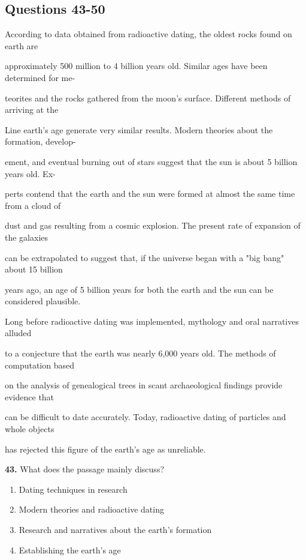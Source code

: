\documentclass[12pt]{article}
\begin{document}
\subsection*{Questions 43-50}
\begingroup
\small
\sloppy
\setlength{\parskip}{0pt}
\setlength{\parindent}{0pt}
According to data obtained from radioactive dating, the oldest rocks found on earth are\par
approximately 500 million to 4 billion years old. Similar ages have been determined for me-\par
teorites and the rocks gathered from the moon's surface. Different methods of arriving at the\par
Line earth's age generate very similar results. Modern theories about the formation, develop-\par
ement, and eventual burning out of stars suggest that the sun is about 5 billion years old. Ex-\par
perts contend that the earth and the sun were formed at almost the same time from a cloud of\par
dust and gas resulting from a cosmic explosion. The present rate of expansion of the galaxies\par
can be extrapolated to suggest that, if the universe began with a "big bang" about 15 billion\par
years ago, an age of 5 billion years for both the earth and the sun can be considered plausible.\par
Long before radioactive dating was implemented, mythology and oral narratives alluded\par
to a conjecture that the earth was nearly 6,000 years old. The methods of computation based\par
on the analysis of genealogical trees in scant archaeological findings provide evidence that\par
can be difficult to date accurately. Today, radioactive dating of particles and whole objects\par
has rejected this figure of the earth's age as unreliable.\par
\endgroup
\medskip
\noindent\textbf{43.} What does the passage mainly discuss?
\begin{enumerate}[label=(\Alph*),leftmargin=*,itemsep=0.2em]
\item Dating techniques in research
\item Modern theories and radioactive dating
\item Research and narratives about the earth's formation
\item Establishing the earth's age
\end{enumerate}
\end{document}
